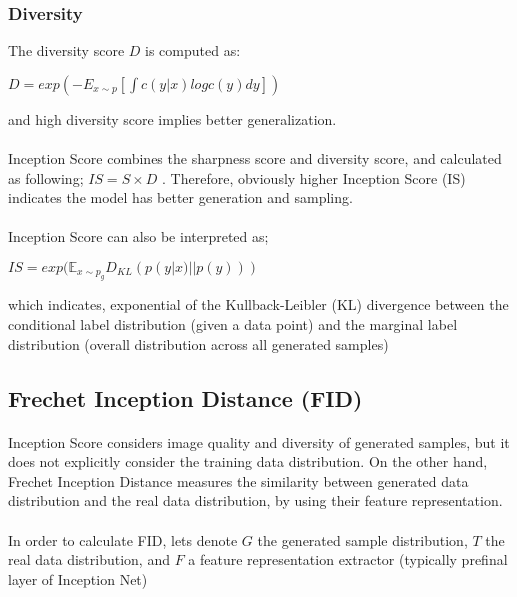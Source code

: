 \documentclass{article}
\begin{document}
        \subsubsection{Diversity}
        The diversity score $D$ is computed as:
        \begin{center}
            $D = exp(-E_{x\sim p}[\int c(y|x)logc(y)dy])$
        \end{center}
        and high diversity score implies better generalization.
        \paragraph{}
        Inception Score combines the sharpness score and diversity score, and calculated as following; $IS = S \times D$ . Therefore, obviously higher Inception Score (IS) indicates the model has better generation and sampling.
        \paragraph{}
        Inception Score can also be interpreted as;
        \begin{center}
            $IS = exp(\mathbb{E}_{x\sim p_g}D_{KL}(p(y|x)||p(y)))$
        \end{center}
        which indicates, exponential of the Kullback-Leibler (KL) divergence between the conditional label distribution (given a data point) and the marginal label distribution (overall distribution across all generated samples)
    \subsection{Frechet Inception Distance (FID)}
    \paragraph{}
    Inception Score considers image quality and diversity of generated samples, but it does not explicitly consider the training data distribution. On the other hand, Frechet Inception Distance measures the similarity between generated data distribution and the real data distribution, by using their feature representation.

    \paragraph{}
    In order to calculate FID, lets denote $G$ the generated sample distribution, $T$ the real data distribution, and $F$ a feature representation extractor (typically prefinal layer of Inception Net)
\end{document}
